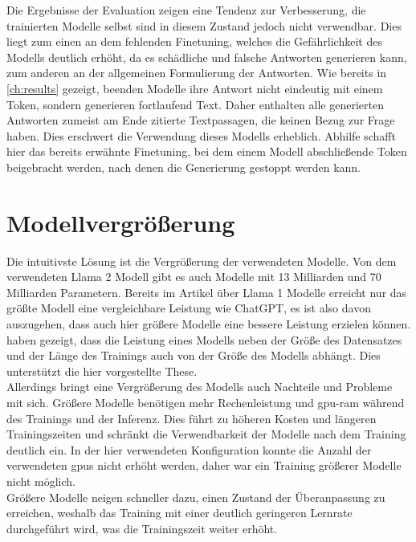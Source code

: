 Die Ergebnisse der Evaluation zeigen eine Tendenz zur Verbesserung, die trainierten Modelle selbst sind in diesem Zustand jedoch nicht verwendbar.
Dies liegt zum einen an dem fehlenden Finetuning, welches die Gefährlichkeit des Modells deutlich erhöht, da es schädliche und falsche Antworten generieren kann, zum anderen an der allgemeinen Formulierung der Antworten.
Wie bereits in \cref{ch:results} gezeigt, beenden Modelle ihre Antwort nicht eindeutig mit einem Token, sondern generieren fortlaufend Text.
Daher enthalten alle generierten Antworten zumeist am Ende zitierte Textpassagen, die keinen Bezug zur Frage haben.
Dies erschwert die Verwendung dieses Modells erheblich.
Abhilfe schafft hier das bereits erwähnte Finetuning, bei dem einem Modell abschließende Token beigebracht werden, nach denen die Generierung gestoppt werden kann.
\section{Modellvergrößerung}
Die intuitivste Lösung ist die Vergrößerung der verwendeten Modelle.
Von dem verwendeten Llama 2 Modell gibt es auch Modelle mit 13 Milliarden und 70 Milliarden Parametern.
Bereits im Artikel \citet{llama} über Llama 1 Modelle erreicht nur das größte Modell eine vergleichbare Leistung wie ChatGPT, es ist also davon auszugehen, dass auch hier größere Modelle eine bessere Leistung erzielen können.
\citet{scaling_laws} haben gezeigt, dass die Leistung eines Modells neben der Größe des Datensatzes und der Länge des Trainings auch von der Größe des Modells abhängt.
Dies unterstützt die hier vorgestellte These.\\

Allerdings bringt eine Vergrößerung des Modells auch Nachteile und Probleme mit sich.
Größere Modelle benötigen mehr Rechenleistung und \ac{gpu}-\ac{ram} während des Trainings und der Inferenz.
Dies führt zu höheren Kosten und längeren Trainingszeiten
und schränkt die Verwendbarkeit der Modelle nach dem Training deutlich ein.
In der hier verwendeten Konfiguration konnte die Anzahl der verwendeten \acp{gpu} nicht erhöht werden,
daher war ein Training größerer Modelle nicht möglich.\\

Größere Modelle neigen schneller dazu, einen Zustand der Überanpassung zu erreichen, weshalb das Training mit einer deutlich geringeren Lernrate durchgeführt wird, was die Trainingszeit weiter erhöht.\\

